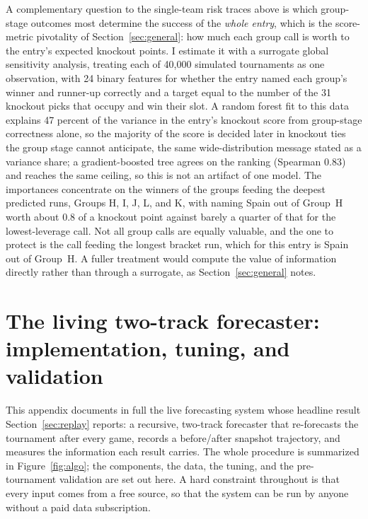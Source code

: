 \documentclass[11pt,letterpaper]{article}
\begin{document}
A complementary question to the single-team risk traces above is which group-stage outcomes most determine the success of the \emph{whole entry}, which is the score-metric pivotality of Section~\ref{sec:general}: how much each group call is worth to the entry's expected knockout points. I estimate it with a surrogate global sensitivity analysis, treating each of 40{,}000 simulated tournaments as one observation, with 24 binary features for whether the entry named each group's winner and runner-up correctly and a target equal to the number of the 31 knockout picks that occupy and win their slot. A random forest fit to this data explains 47 percent of the variance in the entry's knockout score from group-stage correctness alone, so the majority of the score is decided later in knockout ties the group stage cannot anticipate, the same wide-distribution message stated as a variance share; a gradient-boosted tree agrees on the ranking (Spearman 0.83) and reaches the same ceiling, so this is not an artifact of one model. The importances concentrate on the winners of the groups feeding the deepest predicted runs, Groups H, I, J, L, and K, with naming Spain out of Group~H worth about 0.8 of a knockout point against barely a quarter of that for the lowest-leverage call. Not all group calls are equally valuable, and the one to protect is the call feeding the longest bracket run, which for this entry is Spain out of Group~H. A fuller treatment would compute the value of information directly rather than through a surrogate, as Section~\ref{sec:general} notes.



\section{The living two-track forecaster: implementation, tuning, and validation}\label{app:prophet}

This appendix documents in full the live forecasting system whose headline result Section~\ref{sec:replay} reports: a recursive, two-track forecaster that re-forecasts the tournament after every game, records a before/after snapshot trajectory, and measures the information each result carries. The whole procedure is summarized in Figure~\ref{fig:algo}; the components, the data, the tuning, and the pre-tournament validation are set out here. A hard constraint throughout is that every input comes from a free source, so that the system can be run by anyone without a paid data subscription.
\end{document}
